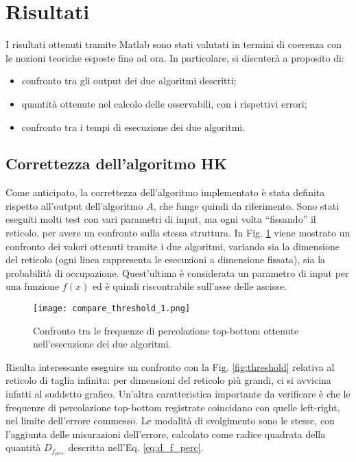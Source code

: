 \section{Risultati}
I risultati ottenuti tramite Matlab sono stati valutati in termini di coerenza con 
le nozioni teoriche esposte fino ad ora. In particolare, si discuterà a proposito di:
\begin{itemize}
    \item confronto tra gli output dei due algoritmi descritti;
    \item quantità ottenute nel calcolo delle osservabili, con i rispettivi errori;
    \item confronto tra i tempi di esecuzione dei due algoritmi.
\end{itemize}

\subsection*{Correttezza dell'algoritmo HK}
Come anticipato, la correttezza dell'algoritmo implementato è stata definita rispetto 
all'output dell'algoritmo $A$, che funge quindi da riferimento.
Sono stati eseguiti molti test con vari parametri di input, ma ogni volta 
``fissando'' il reticolo, per avere un confronto sulla stessa struttura.
In Fig. \ref{fig:compare_threshold} viene mostrato un confronto dei valori 
ottenuti tramite i due algoritmi, variando sia la dimensione del reticolo (ogni linea
rappresenta le esecuzioni a dimensione fissata), sia la probabilità di occupazione.
Quest'ultima è considerata un parametro di input per una funzione $f(x)$ ed è
quindi riscontrabile sull'asse delle ascisse. 
\begin{figure}[ht]
    \texttt{[image: compare\_threshold\_1.png]}
    \caption{Confronto tra le frequenze di percolazione top-bottom ottenute nell'esecuzione
    dei due algoritmi.}
    \label{fig:compare_threshold}
\end{figure}
Risulta interessante eseguire un confronto con la Fig. \ref{fig:threshold} 
relativa al reticolo di taglia infinita: per dimensioni del reticolo più grandi, ci 
si avvicina infatti al suddetto grafico.
Un'altra caratteristica importante da verificare è che le frequenze di 
percolazione top-bottom registrate coincidano con quelle left-right, nel limite 
dell'errore commesso. Le modalità di svolgimento sono le stesse, con l'aggiunta 
delle misurazioni dell'errore, calcolato come radice quadrata della quantità 
$D_{f_{perc}}$ descritta nell'Eq. \ref{eq:d_f_perc}.
